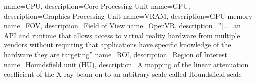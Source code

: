 
\makeglossaries

{
	name=CPU,
	description={Core Processing Unit}
}
{
	name=GPU,
	description={Graphics Processing Unit}
}
{
	name=VRAM,
	description={GPU memory}
}
{
	name=FOV,
	description={Field of View}
}
{
name=OpenVR,
description={''[...] an API and runtime that allows access to virtual reality hardware from multiple vendors without requiring that applications have specific knowledge of the hardware they are targeting''\cite{valvesoftwareOpenVRSDK2024}}
}
{
	name=ROI,
	description={Region of Interest}
}
{
	name=Houndsfield unit (HU),
	description={A mapping of the linear attenuation coefficient of the X-ray beam on to an arbitrary scale called Houndsfield scale\cite{denotterHounsfieldUnit2024}}
}
